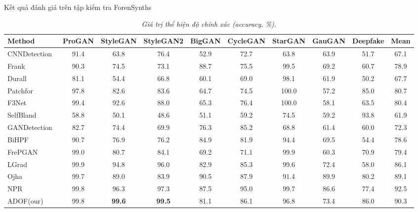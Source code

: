 \begin{table}[h]%
\scriptsize 
\centering
\renewcommand{\arraystretch}{1.2} %
\caption{Kết quả đánh giá trên tập kiểm tra ForenSynths}
\caption*{\textit{Giá trị thể hiện độ chính xác (accuracy, \%).}}
\label{tab:table1}
\begin{adjustbox}{max width=\textwidth}
\begin{tabular}{|l| cc cc cc cc| c|}
\hline
\multirow{1}{*}{\textbf{Method}} & \multicolumn{1}{c}{\textbf{ProGAN}} & \multicolumn{1}{c}{\textbf{StyleGAN}} & \multicolumn{1}{c}{\textbf{StyleGAN2}} & \multicolumn{1}{c}{\textbf{BigGAN}} & \multicolumn{1}{c}{\textbf{CycleGAN}} & \multicolumn{1}{c}{\textbf{StarGAN}} & \multicolumn{1}{c}{\textbf{GauGAN}} & \multicolumn{1}{c|}{\textbf{Deepfake}} & \multicolumn{1}{c|}{\textbf{Mean}} \\ 
\hline
CNNDetection~\cite{Wang2019CNNGeneratedIA} & 91.4 & 63.8 & 76.4 & 52.9 & 72.7 & 63.8 & 63.9  & 51.7 & 67.1 \\ 
Frank~\cite{Frank2020LeveragingFA} & 90.3 & 74.5 & 73.1 & 88.7 & 75.5 & 99.5 		& 69.2   & 60.7 & 78.9  \\ 
Durall~\cite{Durall2020WatchYU} & 81.1 & 54.4 & 66.8 & 60.1 & 69.0 & 98.1    		& 61.9 & 50.2 & 67.7  \\ 
Patchfor~\cite{Chai2020WhatMF} & 97.8 & 82.6 & 83.6 & 64.7 & 74.5 & 100.0    		& 57.2  & 85.0 & 80.7  \\ 
F3Net~\cite{Qian2020ThinkingIF} & 99.4 & 92.6 & 88.0 & 65.3 & 76.4 & 100.0  		& 58.1  & 63.5 & 80.4 \\ 
SelfBland~\cite{Shiohara2022DetectingDW} & 58.8 & 50.1 & 48.6 & 51.1 & 59.2 & 74.5    & 59.2   & 93.8 & 61.9\\ 
GANDetection~\cite{Mandelli2022DetectingGI} & 82.7 & 74.4 & 69.9 & 76.3 & 85.2 & 68.8 & 61.4   & 60.0 & 72.3  \\ 
BiHPF~\cite{Jeong2021BiHPFBH} & 90.7 & 76.9 & 76.2 & 84.9 & 81.9 & 94.4 			  & 69.5  & 54.4 & 78.6 \\ 
FrePGAN~\cite{Jeong2022FrePGANRD} & 99.0 & 80.7 & 84.1 & 69.2 & 71.1 & 99.9  		  & 60.3  & 70.9 & 79.4 \\ 
LGrad~\cite{Tan2023LearningOG} & 99.9 & 94.8 & 96.0 & 82.9 & 85.3 & 99.6  & 72.4  & 58.0 & 86.1 \\ 
Ojha~\cite{Ojha2023TowardsUF} & 99.7 & 89.0 & 83.9 & 90.5 & 87.9 & 91.4   & 89.9  & 80.2 & 89.1 \\ 
NPR~\cite{Tan2023RethinkingTU} & 99.8 & 96.3 & 97.3 & 87.5 & 95.0 & 99.7  & 86.6  & 77.4 & 92.5 \\ 
{ADOF(our)} & 99.8 & \textbf{99.6} & \textbf{99.5} & 81.1 & 86.1 & 96.8   & 73.4  & 86.0 & 90.3  \\ 
\hline
\end{tabular}
\end{adjustbox}
\end{table}





